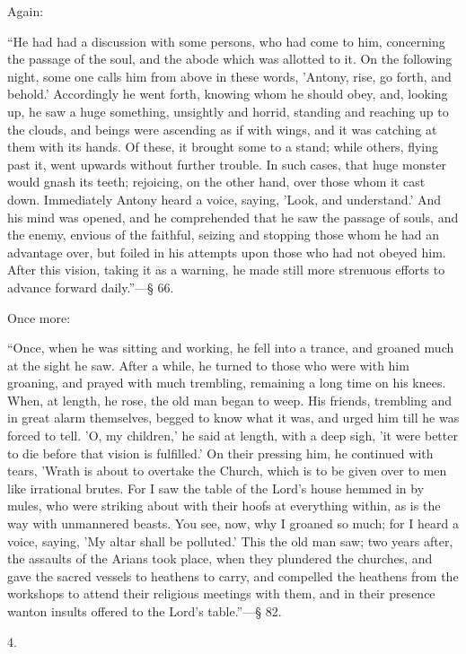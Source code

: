 Again:

``He had had a discussion with some persons, who had come to
him, concerning the passage of the soul, and the abode which was
allotted to it. On the following night, some one calls him from above
in these words, 'Antony, rise, go forth, and behold.' Accordingly he
went forth, knowing whom he should obey, and, looking up, he saw a
huge something, unsightly and horrid, standing and reaching up to the
clouds, and beings were ascending as if with wings, and it was
catching at them with its hands. Of these, it brought some to a stand;
while others, flying past it, went upwards without further trouble. In
such cases, that huge monster would gnash its teeth; rejoicing, on the
other hand, over those whom it cast down. Immediately Antony heard a
voice, saying, 'Look, and understand.' And his mind was opened, and he
comprehended that he saw the passage of souls, and the enemy, envious
of the faithful, seizing and stopping those whom he had an advantage
over, but foiled in his attempts upon those who had not obeyed him.
After this vision, taking it as a warning, he made still more
strenuous efforts to advance forward daily.''—§ 66.

Once more:

``Once, when he was sitting and working, he fell into a trance,
and groaned much at the sight he saw. After a while, he turned to
those who were with him groaning, and prayed with much trembling,
remaining a long time on his knees. When, at
length, he rose, the old man began to weep. His friends, trembling and
in great alarm themselves, begged to know what it was, and urged him
till he was forced to tell. 'O, my children,' he said at length, with
a deep sigh, 'it were better to die before that vision is fulfilled.'
On their pressing him, he continued with tears, 'Wrath is about to
overtake the Church, which is to be given over to men like irrational
brutes. For I saw the table of the Lord's house hemmed in by mules,
who were striking about with their hoofs at everything within, as is
the way with unmannered beasts. You see, now, why I groaned so much;
for I heard a voice, saying, 'My altar shall be polluted.' This the
old man saw; two years after, the assaults of the Arians took place,
when they plundered the churches, and gave the sacred vessels to
heathens to carry, and compelled the heathens from the workshops to
attend their religious meetings with them, and in their presence
wanton insults offered to the Lord's table.''—§ 82.

4.

